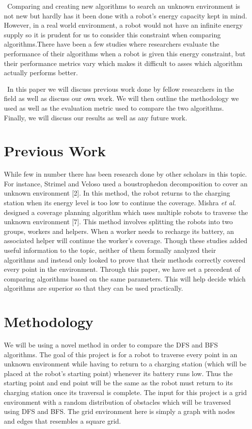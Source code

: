 \documentclass[conference]{IEEEtran}
\begin{document}
\
Comparing and creating new algorithms to search an unknown environment is not new but hardly has it been done with a robot's energy capacity kept in mind. However, in a real world environment, a robot would not have an infinite energy supply so it is prudent for us to consider this constraint when comparing algorithms.There have been a few studies where researchers evaluate the performance of their algorithms when a robot is given this energy constraint, but their performance metrics vary which makes it difficult to asses which algorithm actually performs better.

\
In this paper we will discuss previous work done by fellow researchers in the field as well as discuss our own work. We will then outline the methodology we used as well as the evaluation metric used to compare the two algorithms. Finally, we will discuss our results as well as any future work.

\section{Previous Work}
While few in number there has been research done by other scholars in this topic. For instance, Strimel and Veloso used a boustrophedon decomposition to cover an unknown environment [2]. In this method, the robot returns to the charging station when its energy level is too low to continue the coverage. Mishra \textit{et al.} designed a coverage planning algorithm which uses multiple robots to traverse the unknown environment [7]. This method involves splitting the robots into two groups, workers and helpers. When a worker needs to recharge its battery, an associated helper will continue the worker’s coverage. Though these studies added useful information to the topic, neither of them formally analyzed their algorithms and instead only looked to prove that their methods correctly covered every point in the environment. Through this paper, we have set a precedent of comparing algorithms based on the same parameters. This will help decide which algorithms are superior so that they can be used practically.

\section{Methodology}
We will be using a novel method in order to compare the DFS and BFS algorithms. The goal of this project is for a robot to traverse every point in an unknown environment while having to return to a charging station (which will be placed at the robot's starting point) whenever its battery runs low. Thus the starting point and end point will be the same as the robot must return to its charging station once its traversal is complete. The input for this project is a grid environment with a random distribution of obstacles which will be traversed using DFS and BFS. The grid environment here is simply a graph with nodes and edges that resembles a square grid. 
\end{document}
